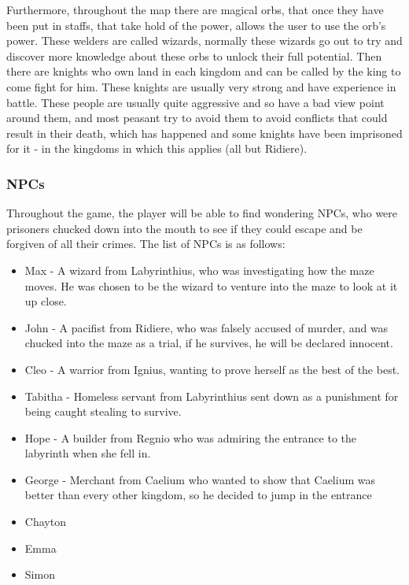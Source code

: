 \documentclass{article}
\begin{document}
\begin{itemize}
                \end{itemize}

                Furthermore, throughout the map there are magical orbs, that once they have been put in staffs, that take hold of the power, allows the user to use the orb's power. These welders are called wizards, normally these wizards go out to try and discover more knowledge about these orbs to unlock their full potential. Then there are knights who own land in each kingdom and can be called by the king to come fight for him. These knights are usually very strong and have experience in battle. These people are usually quite aggressive and so have a bad view point around them, and most peasant try to avoid them to avoid conflicts that could result in their death, which has happened and some knights have been imprisoned for it - in the kingdoms in which this applies (all but Ridiere).

            \clearpage
            \subsubsection{NPCs}
                Throughout the game, the player will be able to find wondering NPCs, who were prisoners chucked down into the mouth to see if they could escape and be forgiven of all their crimes. The list of NPCs is as follows:
                \begin{itemize}
                    \item Max - A wizard from Labyrinthius, who was investigating how the maze moves. He was chosen to be the wizard to venture into the maze to look at it up close.
                    \item John - A pacifist from Ridiere, who was falsely accused of murder, and was chucked into the maze as a trial, if he survives, he will be declared innocent.
                    \item Cleo - A warrior from Ignius, wanting to prove herself as the best of the best.
                    \item Tabitha - Homeless servant from Labyrinthius sent down as a punishment for being caught stealing to survive.
                    \item Hope - A builder from Regnio who was admiring the entrance to the labyrinth when she fell in.
                    \item George - Merchant from Caelium who wanted to show that Caelium was better than every other kingdom, so he decided to jump in the entrance
                    \item Chayton
                    \item Emma
                    \item Simon
                \end{itemize}
\end{document}
